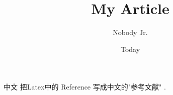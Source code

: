 \documentclass{article}
\begin{document}
 
\title{My Article}
\author{Nobody Jr.}
\date{Today}
\maketitle
中文 
把Latex中的 Reference 写成\cite{name1}中文的"参考文献" \cite{name2}.
\renewcommand\refname{参考献} 
{}
 
% 
\end{document}
